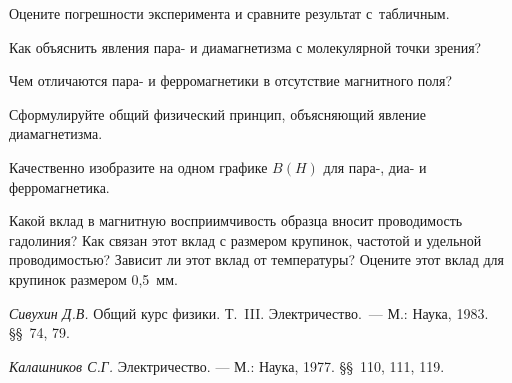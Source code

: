 \n Оцените погрешности эксперимента и сравните результат с~табличным.

{\small

\kv

\n Как объяснить явления пара- и диамагнетизма с молекулярной точки зрения?

\n Чем отличаются пара- и ферромагнетики в отсутствие магнитного поля?

\n Сформулируйте общий физический принцип, объясняющий явление диамагнетизма.

\n Качественно изобразите на одном графике $B(H)$ для пара-, диа- и ферромагнетика.

\nz Какой вклад в магнитную восприимчивость образца вносит проводимость гадолиния? Как связан этот вклад с размером
крупинок, частотой и удельной проводимостью? Зависит ли этот вклад от температуры? Оцените этот вклад для крупинок
размером 0,5~мм.

\lit

\n \emph {Сивухин Д.В.} Общий курс физики. Т.~III. Электричество.~--- М.: Наука, 1983. \S\S~74, 79.

\n \emph{Калашников С.Г.} Электричество. --- М.: Наука, 1977. \S\S~110, 111, 119.

}
